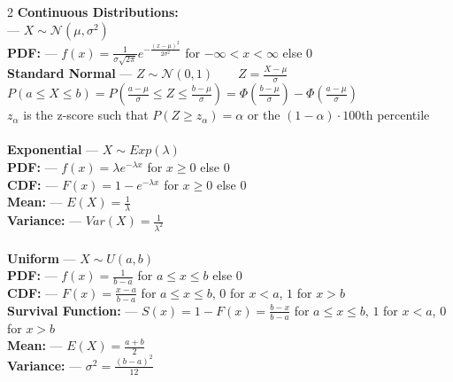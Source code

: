 \documentclass[10pt,letterpaper]{article}
\begin{document}
\begin{multicols}{2}
\textbf{Continuous Distributions:}
\\
 --- $X \sim \mathcal{N}(\mu, \sigma^2)$\\
\textbf{PDF:} --- $f(x) = \frac{1}{\sigma \sqrt{2 \pi}} e^{-\frac{(x - \mu)^2}{2\sigma^2}}$ for $ -\infty < x < \infty $ else $0$\\
\textbf{Standard Normal} --- $Z \sim \mathcal{N}(0, 1) \qquad Z = \frac{X - \mu}{\sigma}$\\
$P(a \leq X \leq b) = P(\frac{a - \mu}{\sigma} \leq Z \leq \frac{b - \mu}{\sigma}) = \Phi(\frac{b - \mu}{\sigma}) - \Phi(\frac{a - \mu}{\sigma})$\\
$z_\alpha$ is the z-score such that $P(Z \geq z_\alpha) = \alpha$ or the $(1 - \alpha) \cdot 100$th percentile\\
\\
\textbf{Exponential} --- $X \sim Exp(\lambda)$\\
\textbf{PDF:} --- $f(x) = \lambda e^{-\lambda x}$ for $ x \geq 0 $ else $0$\\
\textbf{CDF:} --- $F(x) = 1 - e^{-\lambda x}$ for $ x \geq 0 $ else $0$\\
\textbf{Mean:} --- $E(X) = \frac{1}{\lambda}$\\
\textbf{Variance:} --- $Var(X) = \frac{1}{\lambda^2}$\\
\\
\textbf{Uniform} --- $X \sim U(a, b)$\\
\textbf{PDF:} --- $f(x) = \frac{1}{b - a}$ for $ a \leq x \leq b $ else $0$\\
\textbf{CDF:} --- $F(x) = \frac{x - a}{b - a}$ for $ a \leq x \leq b $, $0$ for $ x < a $, $1$ for $ x > b $\\
\textbf{Survival Function:} --- $S(x) = 1 - F(x) = \frac{b - x}{b - a}$ for $ a \leq x \leq b $, $1$ for $ x < a $, $0$ for $ x > b $\\
\textbf{Mean:} --- $E(X) = \frac{a + b}{2}$\\
\textbf{Variance:} --- $\sigma^2 = \frac{(b - a)^2}{12}$\\
\\


\end{multicols}
\end{document}
